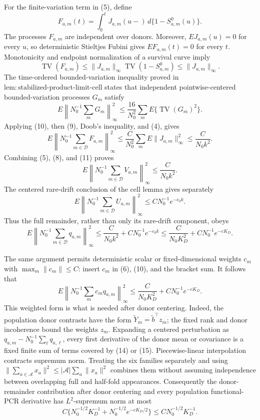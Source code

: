 For the finite-variation term in (5), define
\[
 F_{a,m}(t)=\int_0^tJ_{a,m}(u-)\,d\{1-S^0_{a,m}(u)\}.
\]
The processes \(F_{a,m}\) are independent over donors.  Moreover,
\(EJ_{a,m}(u)=0\) for every \(u\), so deterministic Stieltjes Fubini gives
\(EF_{a,m}(t)=0\) for every \(t\).  Monotonicity and endpoint normalization
of a survival curve imply
\[
 \operatorname{TV}(F_{a,m})
 \leq\|J_{a,m}\|_\infty
      \operatorname{TV}(1-S^0_{a,m})
 \leq\|J_{a,m}\|_\infty.                              \tag{9}
\]
The time-ordered bounded-variation inequality proved in
\(\mathrm{lem:stabilized\mbox{-}product\mbox{-}limit\mbox{-}cell}\)
states that independent pointwise-centered bounded-variation processes
\(G_m\) satisfy
\[
 E\left\|N_0^{-1}\sum_mG_m\right\|_\infty^2
 \leq\frac{16}{N_0^2}\sum_mE\{\operatorname{TV}(G_m)^2\}. \tag{10}
\]
Applying (10), then (9), Doob's inequality, and (4), gives
\[
 E\left\|N_0^{-1}\sum_{m\in\mathcal D}F_{a,m}\right\|_\infty^2
 \leq\frac{C}{N_0^2}\sum_mE\|J_{a,m}\|_\infty^2
 \leq\frac{C}{N_0k^2}.                                \tag{11}
\]
Combining (5), (8), and (11) proves
\[
 E\left\|N_0^{-1}\sum_{m\in\mathcal D}V_{a,m}\right\|_\infty^2
 \leq\frac{C}{N_0k^2}.                                \tag{12}
\]
The centered rare-drift conclusion of the cell lemma gives separately
\[
 E\left\|N_0^{-1}\sum_{m\in\mathcal D}U_{a,m}\right\|_\infty^2
 \leq C N_0^{-1}e^{-c_0k}.                             \tag{13}
\]
Thus the full remainder, rather than only its rare-drift component, obeys
\[
 E\left\|N_0^{-1}\sum_{m\in\mathcal D}q_{a,m}\right\|_\infty^2
 \leq\frac{C}{N_0k^2}+C N_0^{-1}e^{-c_0k}
 \leq\frac{C}{N_0K_D^2}+C N_0^{-1}e^{-cK_D}.           \tag{14}
\]

The same argument permits deterministic scalar or fixed-dimensional weights
\(c_m\) with \(\max_m\|c_m\|\leq C\): insert \(c_m\) in (6), (10), and
the bracket sum.  It follows that
\[
 E\left\|N_0^{-1}\sum_m c_mq_{a,m}\right\|_\infty^2
 \leq\frac{C}{N_0K_D^2}+C N_0^{-1}e^{-cK_D}.           \tag{15}
\]
This weighted form is what is needed after donor centering.  Indeed, the
population donor contrasts have the form
\(\widetilde Y_m=\widetilde b^{\top}z_m\); the fixed rank and donor
incoherence bound the weights \(z_m\).  Expanding a centered perturbation as
\(q_{a,m}-N_0^{-1}\sum_\ell q_{a,\ell}\), every first derivative of the
donor mean or covariance is a fixed finite sum of terms covered by (14) or
(15).  Piecewise-linear interpolation contracts supremum norm.  Treating the
six families separately and using
\(\|\sum_{a\in\mathscr A}x_a\|^2\leq
|\mathscr A|\sum_a\|x_a\|^2\) combines them without assuming independence
between overlapping full and half-fold appearances.  Consequently the
donor-remainder contribution after donor centering and every population
functional-PCR derivative has \(L^2\)-supremum norm at most
\[
 C\{N_0^{-1/2}K_D^{-1}+N_0^{-1/2}e^{-cK_D/2}\}
 \leq C N_0^{-1/2}K_D^{-1}.                            \tag{16}
\]

